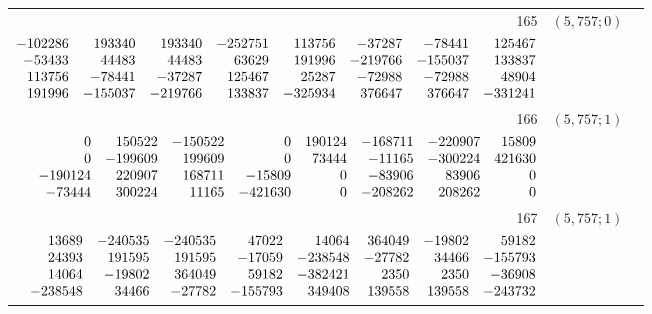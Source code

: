 \documentclass[11pt]{article}
\theoremstyle{remark}
\numberwithin{equation}{section}
\begin{document}
\begin{longtable}{rcl}
165 & $(5,757;0)$ & \begin{tabular}[t]{@{}l@{}}$w_i=\displaystyle \frac{1497456138086954391}{2344746815719121282560000000000000000}$\\[3pt]{\scriptsize$\begin{array}{@{}rrrrrrrr@{}}-102286 & 193340 & 193340 & -252751 & 113756 & -37287 & -78441 & 125467\\-53433 & 44483 & 44483 & 63629 & 191996 & -219766 & -155037 & 133837\\113756 & -78441 & -37287 & 125467 & 25287 & -72988 & -72988 & 48904\\191996 & -155037 & -219766 & 133837 & -325934 & 376647 & 376647 & -331241\end{array}$}\end{tabular}\\[8pt]
166 & $(5,757;1)$ & \begin{tabular}[t]{@{}l@{}}$w_i=\displaystyle \frac{12778292139946942907}{29717211422188802648800000000000000000}$\\[3pt]{\scriptsize$\begin{array}{@{}rrrrrrrr@{}}0 & 150522 & -150522 & 0 & 190124 & -168711 & -220907 & 15809\\0 & -199609 & 199609 & 0 & 73444 & -11165 & -300224 & 421630\\-190124 & 220907 & 168711 & -15809 & 0 & -83906 & 83906 & 0\\-73444 & 300224 & 11165 & -421630 & 0 & -208262 & 208262 & 0\end{array}$}\end{tabular}\\[8pt]
167 & $(5,757;1)$ & \begin{tabular}[t]{@{}l@{}}$w_i=\displaystyle \frac{1821702848961542451}{779075809314445873466000000000000000}$\\[3pt]{\scriptsize$\begin{array}{@{}rrrrrrrr@{}}13689 & -240535 & -240535 & 47022 & 14064 & 364049 & -19802 & 59182\\24393 & 191595 & 191595 & -17059 & -238548 & -27782 & 34466 & -155793\\14064 & -19802 & 364049 & 59182 & -382421 & 2350 & 2350 & -36908\\-238548 & 34466 & -27782 & -155793 & 349408 & 139558 & 139558 & -243732\end{array}$}\end{tabular}\\[8pt]

\end{longtable}
\end{document}

